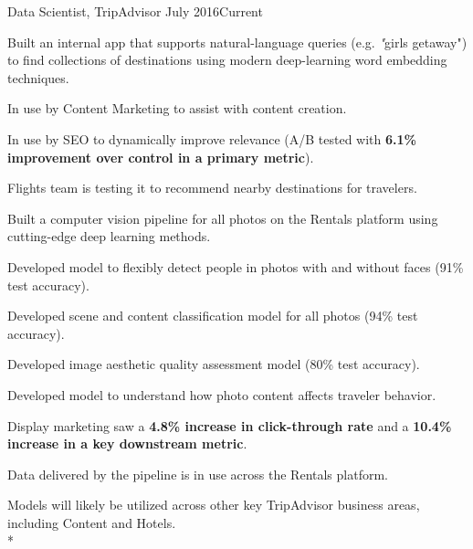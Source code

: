\documentclass[print]{friggeri-cv} %
\begin{document}
\begin{description} \itemsep1pt \parskip0pt 
  \item {\largeheaderfont Data Scientist, TripAdvisor } \hfill
    {\smallheaderfont July 2016\textemdash Current}
    \begin{myitemize} \itemsep1pt \parskip1pt 
      \item Built an internal app that supports natural-language queries
        (e.g. {\textit "girls getaway"}) to find collections of destinations
        using modern deep-learning word embedding techniques.
      \begin{myitemize} \itemsep1pt \parskip1pt 
        \item In use by Content Marketing to assist with content creation.
        \item In use by SEO to dynamically improve relevance (A/B
          tested with \textbf{6.1\% improvement over control in a primary
          metric}).
        \item Flights team is testing it to recommend nearby destinations for
          travelers.
      \end{myitemize}
      \item Built a computer vision pipeline for all photos on the
        Rentals platform using cutting-edge deep learning methods.
        \begin{myitemize} \itemsep1pt \parskip0pt 
          \item Developed model to flexibly detect people in photos with and
            without faces (91\% test accuracy).
          \item Developed scene and content classification model for all photos
            (94\% test accuracy).
          \item Developed image aesthetic quality assessment model (80\%
            test accuracy).
          \item Developed model to understand how photo content affects
            traveler behavior.
          \item Display marketing saw a \textbf{4.8\% increase in click-through
            rate} and a \textbf{10.4\% increase in a key downstream metric}.
          \item Data delivered by the pipeline is in use across the Rentals
            platform.
          \item Models will likely be utilized across other key TripAdvisor
            business areas, including Content and Hotels.\\*
        \end{myitemize}
    \end{myitemize}


  \end{description}
\end{document}
